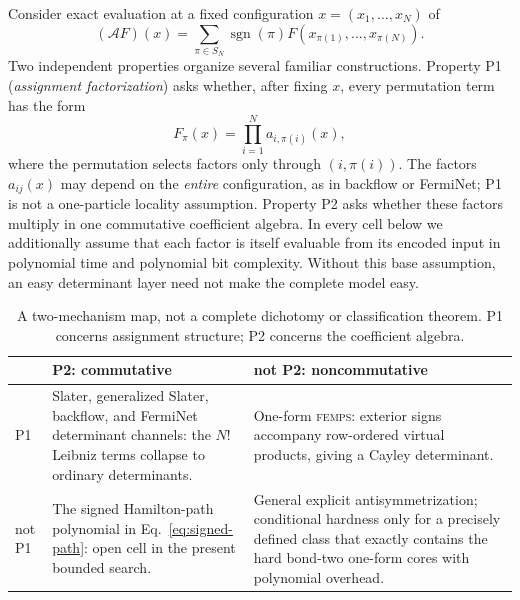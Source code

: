 \documentclass[11pt]{article}
\theoremstyle{definition}
\newcommand{\FEMPS}{\textnormal{\textsc{femps}}}
\begin{document}
Consider exact evaluation at a fixed configuration $x=(x_1,\ldots,x_N)$ of
\begin{equation}
 (\mathcal AF)(x)=\sum_{\pi\in S_N}\operatorname{sgn}(\pi)
 F(x_{\pi(1)},\ldots,x_{\pi(N)}).
 \label{eq:structured-antisymmetrizer}
\end{equation}
Two independent properties organize several familiar constructions.  Property
P1 (\emph{assignment factorization}) asks whether, after fixing $x$, every
permutation term has the form
\begin{equation}
 F_\pi(x)=\prod_{i=1}^N a_{i,\pi(i)}(x),
 \label{eq:p1}
\end{equation}
where the permutation selects factors only through $(i,\pi(i))$.  The factors
$a_{ij}(x)$ may depend on the \emph{entire} configuration, as in backflow or
FermiNet; P1 is not a one-particle locality assumption.  Property P2 asks
whether these factors multiply in one commutative coefficient algebra.  In
every cell below we additionally assume that each factor is itself evaluable
from its encoded input in polynomial time and polynomial bit complexity.
Without this base assumption, an easy determinant layer need not make the
complete model easy.

\begin{table}[t]
\centering
\small
\renewcommand{\arraystretch}{1.12}
\begin{tabularx}{\textwidth}{@{}P{20mm}Y Y@{}}
\toprule
 & P2: commutative & not P2: noncommutative \\
\midrule
P1 & Slater, generalized Slater, backflow, and FermiNet determinant channels:
the $N!$ Leibniz terms collapse to ordinary determinants. & One-form
\FEMPS{}: exterior signs accompany row-ordered virtual products, giving a
Cayley determinant. \\
not P1 & The signed Hamilton-path polynomial in Eq.~\eqref{eq:signed-path}:
open cell in the present bounded search. & General explicit
antisymmetrization; conditional hardness only for a precisely defined class
that exactly contains the hard bond-two one-form cores with polynomial
overhead. \\
\bottomrule
\end{tabularx}
\caption{A two-mechanism map, not a complete dichotomy or classification
theorem.  P1 concerns assignment structure; P2 concerns the coefficient
algebra.}
\label{tab:two-mechanism-map}
\end{table}
\end{document}
